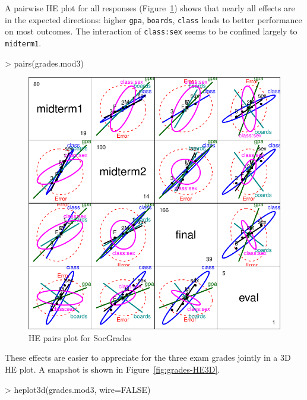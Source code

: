 \documentclass[11pt]{article}
\newcommand{\figref}[1]{Figure~\ref{#1}}
\newcommand{\code}[1]{{\texttt{#1}}}
\begin{document}
A pairwise HE plot for all responses (\figref{fig:grades-pairs}) shows that nearly all 
effects are in the expected directions: higher \code{gpa}, \code{boards}, \code{class}
leads to better performance on most outcomes.  The interaction of
\code{class:sex} seems to be confined largely to \code{midterm1}.
\begin{Schunk}
\begin{Sinput}
> pairs(grades.mod3)
\end{Sinput}
\end{Schunk}

\begin{figure}[htb]
\begin{center}
	\includegraphics[width=.8\textwidth]{fig/plot-grades-pairs}
\caption{HE pairs plot for SocGrades}
\label{fig:grades-pairs}
\end{center}
\end{figure}

These effects are easier to appreciate for the three exam grades jointly in a
3D HE plot. A snapshot is shown in \figref{fig:grades-HE3D}.  
\begin{Schunk}
\begin{Sinput}
> heplot3d(grades.mod3, wire=FALSE)
\end{Sinput}
\end{Schunk}
\end{document}
